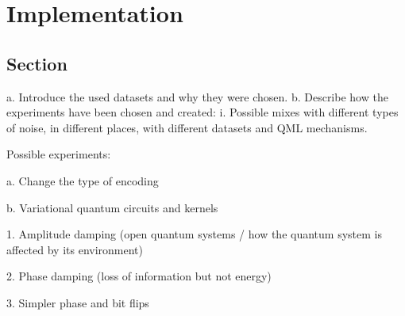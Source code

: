 \chapter{Implementation}\label{chapter:implementation}

\section{Section}
a.	Introduce the used datasets and why they were chosen.
b.	Describe how the experiments have been chosen and created:
    i.	Possible mixes with different types of noise, in different places, with different datasets and QML mechanisms.


Possible experiments: \

a. Change the type of encoding \

b. Variational quantum circuits and kernels \

 1. Amplitude damping (open quantum systems / how the quantum system is affected by its environment) \

 2. Phase damping (loss of information but not energy) \

 3. Simpler phase and bit flips \
